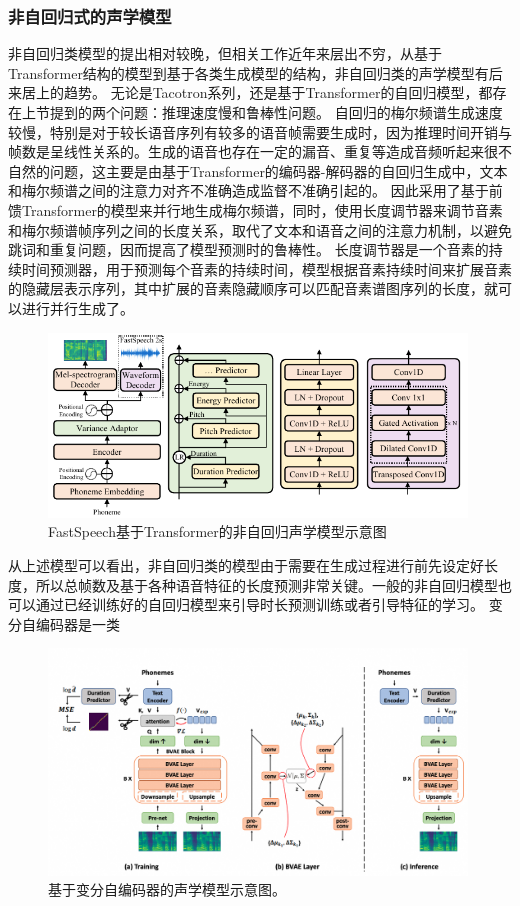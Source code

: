 \subsubsection{非自回归式的声学模型}
非自回归类模型的提出相对较晚，但相关工作近年来层出不穷，从基于Transformer结构的模型到基于各类生成模型的结构，非自回归类的声学模型有后来居上的趋势。
无论是Tacotron系列，还是基于Transformer的自回归模型，都存在上节提到的两个问题：推理速度慢和鲁棒性问题。
自回归的梅尔频谱生成速度较慢，特别是对于较长语音序列有较多的语音帧需要生成时，因为推理时间开销与帧数是呈线性关系的。生成的语音也存在一定的漏音、重复等造成音频听起来很不自然的问题，这主要是由基于Transformer的编码器-解码器的自回归生成中，文本和梅尔频谱之间的注意力对齐不准确造成监督不准确引起的。
因此\citet{ren2019fastspeech}采用了基于前馈Transformer的模型来并行地生成梅尔频谱，同时，使用长度调节器来调节音素和梅尔频谱帧序列之间的长度关系，取代了文本和语音之间的注意力机制，以避免跳词和重复问题，因而提高了模型预测时的鲁棒性。
长度调节器是一个音素的持续时间预测器，用于预测每个音素的持续时间，模型根据音素持续时间来扩展音素的隐藏层表示序列，其中扩展的音素隐藏顺序可以匹配音素谱图序列的长度，就可以进行并行生成了。
\begin{figure}[htbp]
  \includegraphics[width=0.99\textwidth]{figure/related/fs2.pdf}
  \caption{FastSpeech\citep{ren2019fastspeech}基于Transformer的非自回归声学模型示意图}
\end{figure}
从上述模型可以看出，非自回归类的模型由于需要在生成过程进行前先设定好长度，所以总帧数及基于各种语音特征的长度预测非常关键。一般的非自回归模型也可以通过已经训练好的自回归模型来引导时长预测训练或者引导特征的学习。
变分自编码器是一类
\begin{figure}[htbp]
  \includegraphics[width=0.99\textwidth]{figure/related/bvaetts.png}
  \caption{基于变分自编码器的声学模型示意图\citep{lee2020bidirectional}。}
\end{figure}

